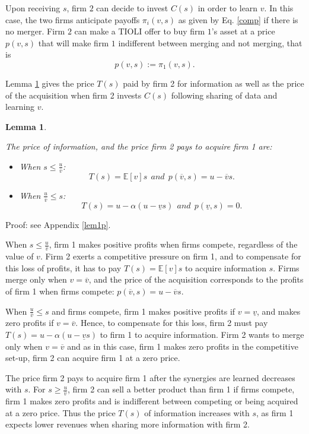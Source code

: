 \documentclass[a4paper,leqno]{article}%
\newtheorem{lemma}{Lemma}
\newcommand{\E}{\mathbb E}
\renewcommand{\a}{\alpha}
\newcommand{\uv}{\underline{v}}
\newcommand{\ov}{\overline{v}}
\begin{document}
Upon receiving $s$, firm $2$ can decide to invest $C(s)$ in order to learn $v$. In this case, the two firms anticipate payoffs $\pi_i(v,s)$ as given by Eq. \eqref{comp} if there is no merger. Firm $2$ can make a TIOLI offer to buy firm $1$'s asset at a price $p(v,s)$ that will make firm $1$ indifferent between merging and not merging, that is 
%
\begin{equation}\label{merger-price}
    p(v,s):=\pi_1(v,s).  
\end{equation}
%

Lemma \ref{lem1} gives the price $T(s)$ paid by firm 2 for information as well as the price of the acquisition when firm 2 invests $C(s)$ following sharing of data and learning $v$.

\begin{lemma}~~\label{lem1}

The price of information, and the price firm 2 pays to acquire firm 1 are: 

\begin{itemize}
    \item When $s\leq \frac{u}{\ov}$:
    $$T(s)=\E[v]s~~and~~p(\ov,s)=u-\ov s.$$ 
    
    \item When $\frac{u}{\ov}\leq s$:
    $$T(s)=u-\a(u-\uv s)~~and~~p(\uv,s)=0.$$
 \end{itemize}

\end{lemma}

\noindent Proof: see Appendix \ref{lem1p}.

\noindent When $s\leq \frac{u}{\ov}$, firm 1 makes positive profits when firms compete, regardless of the value of $v$. Firm 2 exerts a competitive pressure on firm 1, and to compensate for this loss of profits, it has to pay $T(s)=\E[v]s$ to acquire information $s$. Firms merge only when $v=\ov$, and the price of the acquisition corresponds to the profits of firm 1 when firms compete: $p(\ov,s)=u-\ov s$.

When $\frac{u}{\ov}\leq s$ and firms compete, firm 1 makes positive profits if $v=\uv$, and makes zero profits if $v=\ov$. Hence, to compensate for this loss, firm 2 must pay $T(s)=u-\a(u-\uv s)$ to firm 1 to acquire information. Firm 2 wants to merge only when $v=\ov$ and as in this case, firm 1 makes zero profits in the competitive set-up, firm 2 can acquire firm 1 at a zero price.

The price firm 2 pays to acquire firm 1 after the synergies are learned decreases with $s$. For $s\geq\frac{u}{\ov}$, firm 2 can sell a better product than firm 1 if firms compete, firm 1 makes zero profits and is indifferent between competing or being acquired at a zero price. Thus the price $T(s)$ of information increases with $s$, as firm 1 expects lower revenues when sharing more information with firm 2.
\end{document}
